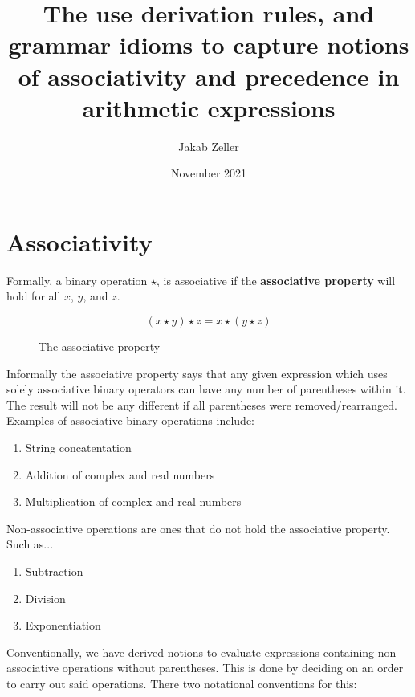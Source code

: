 \documentclass[12pt, letterpaper]{article}
\title{The use derivation rules, and grammar idioms to capture notions of associativity and precedence in arithmetic expressions}
\author{Jakab Zeller}
\date{November 2021}
\theoremstyle{definition}
\begin{document}
\maketitle

\section{Associativity}

Formally, a binary operation $\star$, is associative if the \textbf{associative property} will hold for all $x$, $y$, and $z$.

\begin{figure}[H]
    \begin{equation}
        (x \star y) \star z = x \star (y \star z)
        \nonumber
    \end{equation}
    \caption{The associative property}
\end{figure}

Informally the associative property says that any given expression which uses solely associative binary operators can have any number of parentheses within it. The result will not be any different if all parentheses were removed/rearranged. Examples of associative binary operations include:

\begin{enumerate}
    \item String concatentation
    \item Addition of complex and real numbers
    \item Multiplication of complex and real numbers
\end{enumerate}

Non-associative operations are ones that do not hold the associative property. Such as...

\begin{enumerate}
    \item Subtraction
    \item Division
    \item Exponentiation
\end{enumerate}

Conventionally, we have derived notions to evaluate expressions containing non-associative operations without parentheses. This is done by deciding on an order to carry out said operations. There two notational conventions for this:
\end{document}

